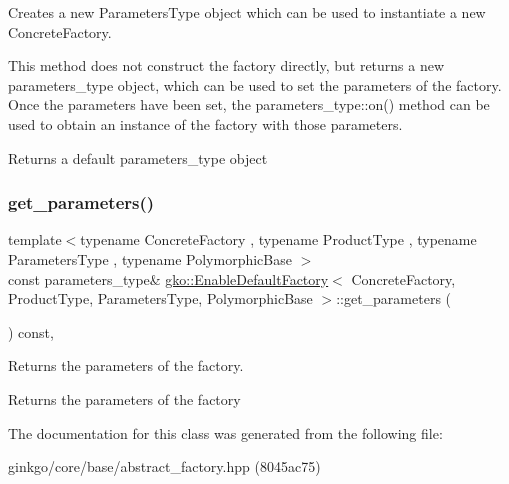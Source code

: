 Creates a new Parameters\+Type object which can be used to instantiate a new Concrete\+Factory. 

This method does not construct the factory directly, but returns a new parameters\+\_\+type object, which can be used to set the parameters of the factory. Once the parameters have been set, the parameters\+\_\+type\+::on() method can be used to obtain an instance of the factory with those parameters.

\begin{DoxyReturn}{Returns}
a default parameters\+\_\+type object 
\end{DoxyReturn}
\mbox{\label{classgko_1_1EnableDefaultFactory_ae32f2b3100640293f3a46e1280965162}} 
\subsubsection{\texorpdfstring{get\+\_\+parameters()}{get\_parameters()}}
{\footnotesize\ttfamily template$<$typename Concrete\+Factory , typename Product\+Type , typename Parameters\+Type , typename Polymorphic\+Base $>$ \\
const parameters\+\_\+type\& \hyperlink{classgko_1_1EnableDefaultFactory}{gko\+::\+Enable\+Default\+Factory}$<$ Concrete\+Factory, Product\+Type, Parameters\+Type, Polymorphic\+Base $>$\+::get\+\_\+parameters (\begin{DoxyParamCaption}{ }\end{DoxyParamCaption}) const\hspace{0.3cm}{\ttfamily [inline]}, {\ttfamily [noexcept]}}



Returns the parameters of the factory. 

\begin{DoxyReturn}{Returns}
the parameters of the factory 
\end{DoxyReturn}


The documentation for this class was generated from the following file\+:\begin{DoxyCompactItemize}
\item 
ginkgo/core/base/abstract\+\_\+factory.\+hpp (8045ac75)\end{DoxyCompactItemize}
